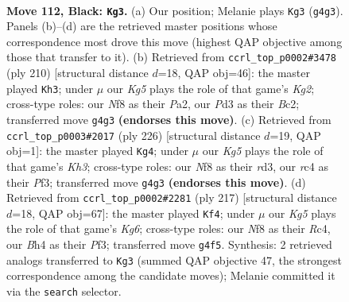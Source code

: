 \documentclass[11pt]{article}
\begin{document}
\clearpage

\begin{figure}[p]\centering
\begin{subfigure}{0.46\textwidth}\centering
\resizebox{\linewidth}{!}{%
\newchessgame
\chessboard[
  setfen={5n2/8/7p/r3p3/2R3kb/3p4/1K6/8 b - - 21 112},
  showmover=false,
  pgfstyle=straightmove, color=movearrow, markmove={g4-g3}
]}
\caption{}
\end{subfigure}\hfill
\begin{subfigure}{0.46\textwidth}\centering
\resizebox{\linewidth}{!}{%
\newchessgame
\chessboard[
  setfen={6r1/8/1p1b4/8/3k4/4R3/P1B2PK1/8 w - - 45 106},
  showmover=false,
  pgfstyle=straightmove, color=movearrow, markmove={g2-h3}
]}
\caption{}
\end{subfigure}
\\[4pt]
\begin{subfigure}{0.46\textwidth}\centering
\resizebox{\linewidth}{!}{%
\newchessgame
\chessboard[
  setfen={8/5k2/1R6/4p3/8/3r1PPK/8/8 w - - 39 114},
  showmover=false,
  pgfstyle=straightmove, color=movearrow, markmove={h3-g4}
]}
\caption{}
\end{subfigure}\hfill
\begin{subfigure}{0.46\textwidth}\centering
\resizebox{\linewidth}{!}{%
\newchessgame
\chessboard[
  setfen={8/6R1/8/5p2/2r5/5pk1/8/5K2 b - - 15 109},
  showmover=false,
  pgfstyle=straightmove, color=movearrow, markmove={g3-f4}
]}
\caption{}
\end{subfigure}
\caption{\textbf{Move 112, Black: \texttt{Kg3}.} (a) Our position; Melanie plays \texttt{Kg3} (\texttt{g4g3}). Panels (b)--(d) are the retrieved master positions whose correspondence most drove this move (highest QAP objective among those that transfer to it). (b) Retrieved from \texttt{ccrl\_top\_p0002\#3478} (ply 210) [structural distance $d$=18, QAP obj=46]: the master played \texttt{Kh3}; under $\mu$ our \emph{Kg5} plays the role of that game's \emph{Kg2}; cross-type roles: our \emph{N}f8 as their \emph{P}a2, our \emph{P}d3 as their \emph{B}c2; transferred move \texttt{g4g3} \textbf{(endorses this move)}. (c) Retrieved from \texttt{ccrl\_top\_p0003\#2017} (ply 226) [structural distance $d$=19, QAP obj=1]: the master played \texttt{Kg4}; under $\mu$ our \emph{Kg5} plays the role of that game's \emph{Kh3}; cross-type roles: our \emph{N}f8 as their \emph{r}d3, our \emph{r}c4 as their \emph{P}f3; transferred move \texttt{g4g3} \textbf{(endorses this move)}. (d) Retrieved from \texttt{ccrl\_top\_p0002\#2281} (ply 217) [structural distance $d$=18, QAP obj=67]: the master played \texttt{Kf4}; under $\mu$ our \emph{Kg5} plays the role of that game's \emph{Kg6}; cross-type roles: our \emph{N}f8 as their \emph{R}c4, our \emph{B}h4 as their \emph{P}f3; transferred move \texttt{g4f5}. Synthesis: 2 retrieved analogs transferred to \texttt{Kg3} (summed QAP objective 47, the strongest correspondence among the candidate moves); Melanie committed it via the \texttt{search} selector.}
\label{fig:thought-m223}
\end{figure}
\end{document}
